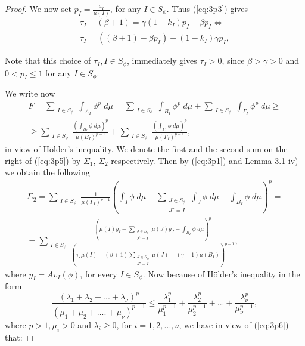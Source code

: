 \documentclass{article}
\numberwithin{equation}{section}
\theoremstyle{definition}
\theoremstyle{remark}
\begin{document}
\begin{proof}
We now set $p_I=\frac{a_I}{\mu(I)}$, for any $I\in S_{\phi}$.
Thus (\ref{eq:3p3}) gives
\begin{multline} \label{eq:3p4}
\tau_I - (\beta +1)=\gamma(1-k_I)p_I-\beta p_I\Leftrightarrow \\
\tau_I=\left( (\beta +1)-\beta p_I \right) + (1-k_I)\gamma p_I,
\end{multline}

Note that this choice of $\tau_I, I\in S_{\phi}$, immediately gives $\tau_I>0$, since $\beta>\gamma>0$ and $0<p_I\leq 1$ for any $I\in S_{\phi}$.

We write now
\begin{multline} \label{eq:3p5}
F=\sum_{\substack{I\in S_\phi}} \int_{A_I}\phi^p\; d\mu= \sum_{\substack{I\in S_\phi}} \int_{B_I}\phi^p\; d\mu+ \sum_{\substack{I\in S_\phi}} \int_{\Gamma_I} \phi^p \; d\mu \geq \\
\geq \sum_{\substack{I\in S_\phi}} \frac{\left(\int_{B_I}\phi\; d\mu\right)^p}{\mu(B_I)^{p-1}}+\sum_{\substack{I\in S_\phi}} \frac{\left(\int_{\Gamma_I}\phi\; d\mu\right)^p}{\mu(\Gamma_I)^{p-1}},
\end{multline}
in view of H{\"o}lder's inequality. We denote the first and the second sum on the right of (\ref{eq:3p5}) by $\Sigma_1$, $\Sigma_2$ respectively.
Then by (\ref{eq:3p1}) and Lemma 3.1 iv) we obtain the following
\begin{multline} \label{eq:3p6}
\Sigma_2= \sum_{\substack{I\in S_\phi}}\frac{1}{\mu(\Gamma_I)^{p-1}}\left( \int_I \phi\; d\mu - \sum_{\substack{J\in S_\phi \\ J^\star=I\ }} \int_J \phi \; d\mu - \int_{B_I}\phi\;d\mu \right)^p=\\
=\sum_{\substack{I\in S_\phi}} \frac{\left( \mu(I)y_I-\sum_{\substack{J\in S_\phi \\ J^\star=I }} \mu(J)y_J-\int_{B_I}\phi\; d\mu \right)^p}{\left( \tau_I \mu(I)-(\beta +1)\sum_{\substack{J\in S_\phi \\ J^\star=I }}\mu(J)-(\gamma+1)\mu(B_I)\right)^{p-1}},
\end{multline}
where $y_I=Av_{I}(\phi)$, for every $I\in S_{\phi}$.
Now because of H{\"o}lder's inequality in the form
\begin{equation} \label{eq:3p7}
\frac{\left(\lambda_1+\lambda_2+...+\lambda_{\nu} \right)^p}{\left( \mu_1+\mu_2+....+\mu_{\nu} \right)^{p-1}}\leq \frac{\lambda_1^p}{\mu_1^{p-1}}+\frac{\lambda_2^p}{\mu_2^{p-1}}+...+ \frac{\lambda_{\nu}^p}{\mu_{\nu}^{p-1}},
\end{equation}
where $p>1,\mu_i>0$ and $\lambda_i\geq 0$, for $i=1,2,...,\nu$, we have in view of (\ref{eq:3p6}) that:

\end{proof}
\end{document}
